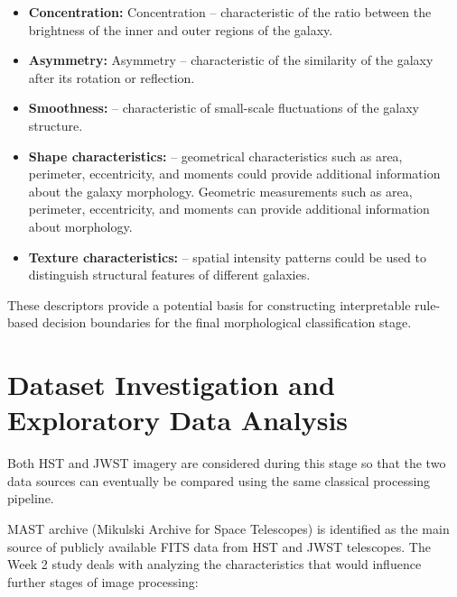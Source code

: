 \documentclass[11pt]{article}
\begin{document}
\begin{itemize}
    \item \textbf{Concentration:} Concentration – characteristic of the ratio between the brightness of the inner and outer regions of the galaxy.
    \item \textbf{Asymmetry:} Asymmetry – characteristic of the similarity of the galaxy after its rotation or reflection.
    \item \textbf{Smoothness:} – characteristic of small-scale fluctuations of the galaxy structure.
    \item \textbf {Shape characteristics:} – geometrical characteristics such as area, perimeter, eccentricity, and moments could provide additional information about the galaxy morphology. Geometric measurements such as area, perimeter, eccentricity, and moments can provide additional information about morphology.
    \item \textbf {Texture characteristics:} – spatial intensity patterns could be used to distinguish structural features of different galaxies.
\end{itemize}

These descriptors provide a potential basis for constructing interpretable rule-based decision boundaries for the final morphological classification stage.


\section{Dataset Investigation and Exploratory Data Analysis}

Both HST and JWST imagery are considered during this stage so that the two data sources can eventually be compared using the same classical processing pipeline.

MAST archive (Mikulski Archive for Space Telescopes) is identified as the main source of publicly available
FITS data from HST and JWST telescopes.
The Week 2 study deals with analyzing the characteristics that would influence further stages of image processing:
\end{document}
